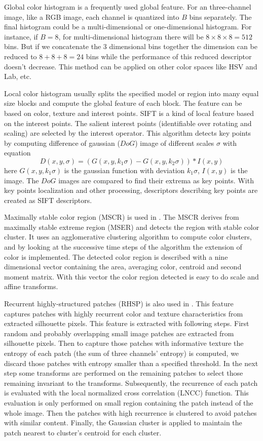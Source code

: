Global color histogram is a frequently used global feature. For an three-channel image, like a RGB image, each channel is quantized into $B$ bins separately. The final histogram could be a multi-dimensional or one-dimensional histogram. For instance, if $B = 8$, for multi-dimensional histogram there will be  $8\times 8\times 8 = 512$ bins. But if we concatenate the 3 dimensional bins together the dimension can be reduced to $8 + 8 + 8 = 24$ bins while the performance of this reduced descriptor doesn't decrease. This method can be applied on other color spaces like HSV and Lab, etc.

Local color histogram usually splits the specified model or region into many equal size blocks and compute the global feature of each block. The feature can be based on color, texture and interest points. SIFT \cite{SIFT} is a kind of local feature based on the interest points. The salient interest points (identifiable over rotating and scaling) are selected by the interest operator. This algorithm detects key points by computing difference of gaussian ($DoG$) image of different scales $\sigma$ with equation
\begin{equation}
D(x,y,\sigma) = (G(x,y,k_1\sigma) - G(x,y,k_2\sigma))\ast I(x,y)
\end{equation}
here $G(x,y,k_1\sigma)$ is the gaussian function with deviation $k_1\sigma$, $I(x,y)$ is the image. The $DoG$ images are compared to find their extrema as key points. With key points localization and other processing, descriptors describing key points are created as SIFT descriptors.

Maximally stable color region (MSCR) is used in \cite{SDALF}. The MSCR derives from maximally stable extreme region (MSER) and detects the region with stable color cluster. It uses an agglomerative clustering algorithm to compute color clusters, and by looking at the successive time steps of the algorithm the extension of color is implemented. The detected color region is described with a nine dimensional vector containing the area, averaging color, centroid and second moment matrix. With this vector the color region detected is easy to do scale and affine transforms.

Recurrent highly-structured patches (RHSP) is also used in \cite{SDALF}. This feature captures patches with highly recurrent color and texture characteristics from extracted silhouette pixels. This feature is extracted with following steps. First random and probably overlapping small image patches are extracted from silhouette pixels. Then to capture those patches with informative texture the entropy of each patch (the sum of three channels' entropy) is computed, we discard those patches with entropy smaller than a specified threshold. In the next step some transforms are performed on the remaining patches to select those remaining invariant to the transforms. Subsequently, the recurrence of each patch is evaluated with the local normalized cross correlation (LNCC) function. This evaluation is only performed on small region containing the patch instead of the whole image. Then the patches with high recurrence is clustered to avoid patches with similar content. Finally, the Gaussian cluster is applied to maintain the patch nearest to cluster's centroid for each cluster.

